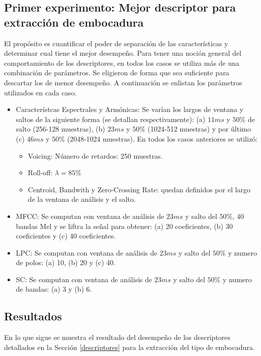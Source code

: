 \documentclass{article}
\begin{document}
\subsection{Primer experimento: Mejor descriptor para extracción de embocadura}
\label{experimento1}

El propósito es cuantificar el poder de separación de las características y determinar cual tiene el mejor desempeño. Para tener una noción general del comportamiento de los descriptores, en todos los casos se utiliza más de una combinación de parámetros. Se eligieron de forma que sea suficiente para descartar los de menor desempeño. A continuación se enlistan los parámetros utilizados en cada caso.

\begin{itemize}
	\item Característcas Espectrales y Armónicas: Se varían los largos de ventana y saltos de la siguiente forma (se detallan respectivamente): (a) $11ms$ y $50\%$ de salto (256-128 muestras), (b) $23ms$ y $50\%$  (1024-512 muestras) y por último (c) $46ms$ y $50\%$  (2048-1024 muestras). En todos los casos anteriores se utilizó: 
	\begin{itemize}
		\item Voicing: Número de retardos: 250 muestras.
		\item Roll-off: $\lambda=85\%$
		\item Centroid, Bandwith y Zero-Crossing Rate: quedan definidos por el largo de la ventana de análisis y el salto.
	\end{itemize}
	\item MFCC: Se computan con ventana de análisis de $23ms$ y salto del $50\%$, 40 bandas Mel y se liftra la señal para obtener: (a) 20 coeficientes, (b) 30 coeficientes y (c) 40 coeficientes.
	\item LPC: Se computan con ventana de análisis de $23ms$ y salto del $50\%$ y numero de polos: (a) 10, (b) 20 y (c) 40.
	\item SC: Se computan con ventana de análisis de $23ms$ y salto del $50\%$ y numero de bandas: (a) 3 y (b) 6.
\end{itemize}

\subsection{Resultados}

En lo que sigue se muestra el resultado del desempeño de los descriptores detallados en la Sección \ref{descriptores} para la extracción del tipo de embocadura.
\medskip
\end{document}
